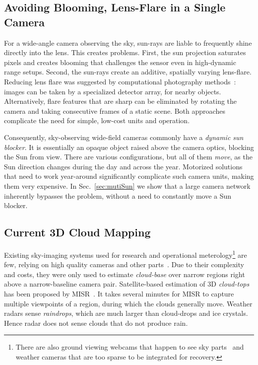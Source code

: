 \documentclass[runningheads]{llncs}
\begin{document}
\subsection{Avoiding Blooming, Lens-Flare in a Single Camera}
\label{sec:Signelflare}

For a wide-angle camera observing the sky, sun-rays are liable to frequently shine directly into the lens. This creates problems. First, the sun projection saturates pixels and creates blooming that challenges the sensor even in high-dynamic range setups. Second, the sun-rays create an additive, spatially varying lens-flare. Reducing lens flare was suggested by computational photography methods~\cite{Koreban2009,Raskar2008,Talvala2007,Rouf2011}: images can be taken by a specialized detector array, for nearby objects. Alternatively, flare features that are sharp can be eliminated by rotating the camera and taking consecutive frames of a static scene. Both approaches complicate the need for simple, low-cost units and operation.

Consequently, sky-observing wide-field cameras commonly have a {\em dynamic sun blocker}. It is essentially an opaque object raised above the camera optics, blocking the Sun from view. There are various configurations, but all of them {\em move}, as the Sun direction changes during the day and across the year. Motorized solutions~\cite{Pust2008} that need to work year-around significantly complicate such camera units, making them very expensive. In Sec.~\ref{sec:mutiSun} we show that a large camera network inherently bypasses the problem, without a need to constantly move a Sun blocker.




\subsection{Current 3D Cloud Mapping}
\label{sec:current3D}

Existing sky-imaging systems used for research and operational meterology\footnote{There are also ground viewing webcams that happen to see sky parts~\cite{bradley} and weather cameras
that are too sparse to be integrated for recovery.} are few, relying on high quality cameras and other parts~\cite{allmen,angeo-27-953-2009,cazorla,long,Seiz,kassianov}. Due to their complexity and costs, they were only used to estimate {\em cloud-base} over narrow regions right above a narrow-baseline camera pair. Satellite-based estimation of 3D {\em cloud-tops} has been proposed by MISR~\cite{Seiz2006}. It takes several minutes for MISR to capture multiple viewpoints of a region, during which the clouds generally move. Weather radars sense {\em raindrops}, which are much larger than cloud-drops and ice crystals. Hence radar does not sense clouds that do not produce rain.
\end{document}
